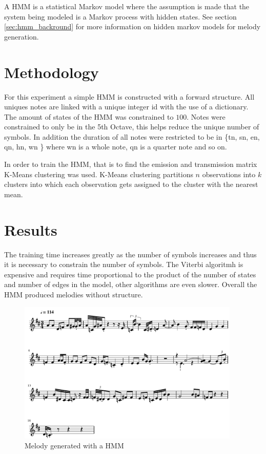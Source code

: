 A \ac{HMM} is a statistical Markov model where the assumption is made that the system being modeled  is a Markov process with hidden states. See section \ref{sec:hmm_backround} for more information on hidden markov models for melody generation.

\section{Methodology}
For this experiment a simple \ac{HMM} is constructed with a forward structure. All uniques notes are linked with a unique integer id with the use of a dictionary. The amount of states of the \ac{HMM} was constrained to $100$. Notes were constrained to only be in the 5th Octave, this helps reduce the unique number of symbols. In addition the duration of all notes were restricted to be in \{tn, sn, en, qn, hn, wn \} where wn is a whole note, qn is a quarter note and so on.

In order to train the \ac{HMM}, that is to find the emission and transmission matrix K-Means clustering was used.
K-Means clustering partitions $n$ observations into $k$ clusters into which each observation gets assigned to the cluster with the nearest mean.

\section{Results}
The training time increases greatly as the number of symbols increases and thus it is necessary to constrain the number of symbols. The Viterbi algoritmh is expensive and requires time proportional to the product of the number of states and number of edges in the model, other algorithms are even slower.
Overall the \ac{HMM} produced melodies without structure.

\begin{figure}
\centerline{\includegraphics[width=400px]{../images/hmm_melody_generated.pdf}}
\caption{Melody generated with a \ac{HMM}}
\label{ims:hmmmelody}
\end{figure}

